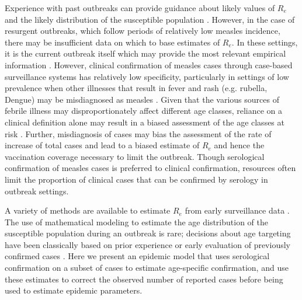 Experience with past outbreaks can provide guidance about likely values of \(R_{e}\) \cite{Durrheim_2014} and the likely distribution of the
susceptible population \cite{Goodson_2011, 25803382}. However, in the case of resurgent outbreaks, which follow periods of relatively low
measles incidence, there may be insufficient data on which to base estimates of \(R_e\). In these settings, it is the current outbreak itself which may provide the most relevant empirical information \cite{Durrheim_2014, Merl_2009, Shea_2014}. However, clinical confirmation of measles cases through case-based surveillance systems has relatively low specificity, particularly in settings of low prevalence \cite{Hutchins_2004,Ho_2014,GUY_2004,31c964} when other illnesses that result in fever and rash (e.g. rubella, Dengue) may be misdiagnosed as measles \cite{Ho_2014}. Given that the various sources of febrile illness may disproportionately affect different age classes, reliance on a clinical definition alone may result in a biased assessment of the age classes at risk \cite{Hutchins_2004,Durrheim_2014}. Further, misdiagnosis of
cases may bias the assessment of the rate of increase of total cases and lead to a biased estimate of \(R_{e}\) and hence the vaccination
coverage necessary to limit the outbreak. Though serological confirmation of measles cases is preferred to clinical confirmation,
resources often limit the proportion of clinical cases that can be confirmed by serology in outbreak settings. 

A variety of methods are available to estimate \(R_{e}\) from early surveillance data \cite{Durrheim_2014,Chiew_2013,Ferrari_2005,Lipsitch_2003}. The use of mathematical modeling to estimate the age distribution of the susceptible population during an outbreak is rare; decisions about age targeting have been classically based
on prior experience or early evaluation of previously confirmed cases \cite{Minetti_2013a}. Here we present an epidemic
model that uses serological confirmation on a subset of cases to estimate age-specific confirmation, and use these estimates to correct the observed number of reported cases before being used to estimate epidemic parameters.

